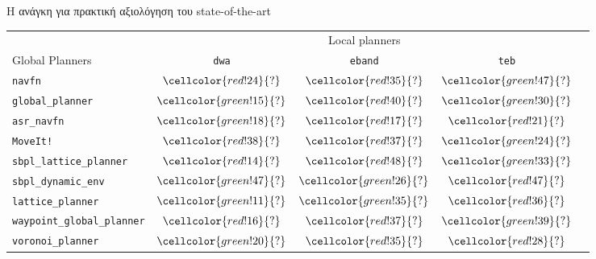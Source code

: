 \begin{frame}{Η ανάγκη για πρακτική αξιολόγηση του state-of-the-art}
{\footnotesize
\begin{table}[h]
\begin{tabular}{lcccc}
  & \multicolumn{3}{c}{Local planners} \\
  \cline{2-4}
  Global Planners                     & \texttt{dwa}                               & \texttt{eband}                             & \texttt{teb} \\ \toprule
  \texttt{navfn}                     & $\cellcolor{red!24}{?}$         & $\cellcolor{red!35}{?}$            & $\cellcolor{green!47}{?}$         \\
  \texttt{global\_planner}           & $\cellcolor{green!15}{?}$         & $\cellcolor{red!40}{?}$            & $\cellcolor{green!30}{?}$         \\
  \texttt{asr\_navfn}                & $\cellcolor{green!18}{?}$         & $\cellcolor{red!17}{?}$            & $\cellcolor{red!21}{?}$         \\
  \texttt{MoveIt!}                   & $\cellcolor{red!38}{?}$         & $\cellcolor{red!37}{?}$            & $\cellcolor{green!24}{?}$         \\
  \texttt{sbpl\_lattice\_planner}    & $\cellcolor{red!14}{?}$         & $\cellcolor{red!48}{?}$            & $\cellcolor{green!33}{?}$         \\
  \texttt{sbpl\_dynamic\_env}        & $\cellcolor{green!47}{?}$         & $\cellcolor{green!26}{?}$            & $\cellcolor{red!47}{?}$         \\
  \texttt{lattice\_planner}          & $\cellcolor{green!11}{?}$         & $\cellcolor{green!35}{?}$            & $\cellcolor{red!36}{?}$         \\
  \texttt{waypoint\_global\_planner} & $\cellcolor{red!16}{?}$         & $\cellcolor{red!37}{?}$            & $\cellcolor{green!39}{?}$         \\
  \texttt{voronoi\_planner}          & $\cellcolor{green!20}{?}$         & $\cellcolor{red!35}{?}$            & $\cellcolor{red!28}{?}$         \\ \bottomrule
\end{tabular}
\end{table}
}

\end{frame}

